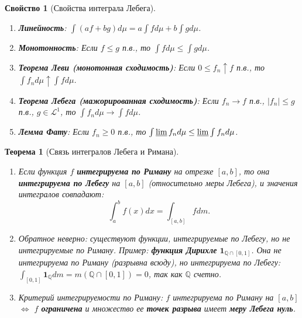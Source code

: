 \documentclass[a4paper, 12pt]{article}
\newtheorem{theorem}{Теорема}
\newtheorem{property}{Свойство}
\newcommand{\Q}{\mathbb{Q}}
\newcommand{\1}{\mathbf{1}}
\begin{document}
\begin{property}[Свойства интеграла Лебега]
    \hfill
    \begin{enumerate}[label=(\arabic*)]
        \item \textbf{Линейность}: $\int (af + bg)  d\mu = a\int f  d\mu + b\int g  d\mu$.
        \item \textbf{Монотонность}: Если $f \leq g$ п.в., то $\int f  d\mu \leq \int g  d\mu$.
        \item \textbf{Теорема Леви (монотонная сходимость)}: Если $0 \leq f_n \uparrow f$ п.в., то $\int f_n  d\mu \uparrow \int f  d\mu$.
        \item \textbf{Теорема Лебега (мажорированная сходимость)}: Если $f_n \to f$ п.в., $|f_n| \leq g$ п.в., $g \in \mathcal{L}^1$, то $\int f_n  d\mu \to \int f  d\mu$.
        \item \textbf{Лемма Фату}: Если $f_n \geq 0$ п.в., то $\int \varliminf f_n  d\mu \leq \varliminf \int f_n  d\mu$.
    \end{enumerate}
\end{property}

\begin{theorem}[Связь интегралов Лебега и Римана]
    \hfill
    \begin{enumerate}[label=(\roman*)]
        \item Если функция $f$ \textbf{интегрируема по Риману} на отрезке $[a,b]$, то она \textbf{интегрируема по Лебегу} на $[a,b]$ (относительно меры Лебега), и значения интегралов совпадают:
        \[
        \int_{a}^{b} f(x)  dx = \int_{[a,b]} f  dm.
        \]
        \item Обратное неверно: существуют функции, интегрируемые по Лебегу, но не интегрируемые по Риману. Пример: \textbf{функция Дирихле} $\1_{\Q \cap [0,1]}$. Она не интегрируема по Риману (разрывна всюду), но интегрируема по Лебегу: $\int_{[0,1]} \1_{\Q}  dm = m(\Q \cap [0,1]) = 0$, так как $\Q$ счетно.
        \item Критерий интегрируемости по Риману: $f$ интегрируема по Риману на $[a,b]$ $\Leftrightarrow$ $f$ \textbf{ограничена} и множество ее \textbf{точек разрыва} имеет \textbf{меру Лебега нуль}.
    \end{enumerate}
\end{theorem}

\end{document}
